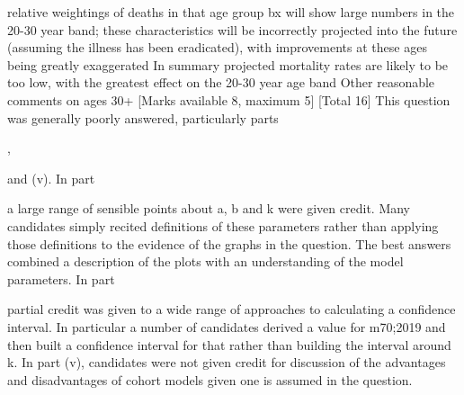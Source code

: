 relative weightings of deaths in that age group 
bx will show large numbers in the 20-30 year band; these characteristics will be incorrectly projected into the future (assuming the illness has been eradicated), with improvements at these ages being greatly exaggerated 
In summary projected mortality rates are likely to be too low, with the greatest effect
on the 20-30 year age band 
\medskip 
Other reasonable comments on ages 30+ 
[Marks available 8, maximum 5]
[Total 16]
This question was generally poorly answered, particularly parts \item  , \item  and (v).
In part \item   a large range of sensible points about a, b and k were given credit. Many candidates simply recited definitions of these parameters rather than applying those definitions to the evidence of the graphs in the question. The best answers combined a description of the plots with an understanding of the model parameters.
In part \item  partial credit was given to a wide range of approaches to calculating a confidence interval. In particular a number of candidates derived a value for m70;2019 and then built a confidence interval for that rather than building the interval around k.
In part (v), candidates were not given credit for discussion of the advantages and disadvantages of cohort models given one is assumed in the question.
